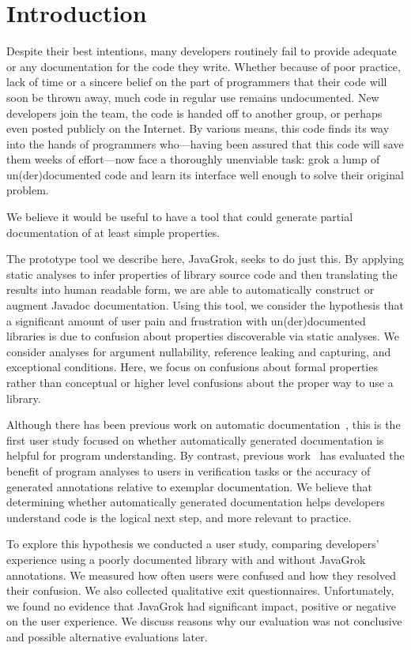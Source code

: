 \section{Introduction}

Despite their best intentions, many developers routinely fail to provide
adequate or any documentation for the code they write.  Whether because of poor
practice, lack of time or a sincere belief on the part of programmers that their
code will soon be thrown away, much code in regular use remains undocumented.
New developers join the team, the code is handed off to another group, or
perhaps even posted publicly on the Internet.  By various means, this code
finds its way into the hands of programmers who---having been assured that this
code will save them weeks of effort---now face a thoroughly unenviable task:
grok a lump of un(der)documented code and learn its interface well enough
to solve their original problem.

We believe it would be useful to have a tool that could generate partial
documentation of at least simple properties.

The prototype tool we describe here, JavaGrok, seeks to do just this.  By
applying static analyses to infer properties of library source code and then
translating the results into human readable form, we are able to
automatically construct or augment Javadoc documentation.
Using this tool, we
consider the hypothesis that a significant amount of user pain and frustration
with un(der)documented libraries is due to confusion about
properties discoverable via static analyses. We consider analyses for argument nullability,
reference leaking and capturing, and exceptional conditions.
Here, we focus on confusions about formal properties
rather than conceptual
or higher level confusions about the proper way to use a library.

Although there has been previous work on automatic
documentation~\cite{autodoc}, this is the first user study
focused on whether automatically generated documentation is helpful for program
understanding.  By contrast, previous work~\cite{autodoc, Nimmer2002} has
evaluated the benefit of program analyses to users in verification tasks or the
accuracy of generated annotations relative to exemplar documentation.
We believe that determining whether automatically generated documentation helps
developers understand code is the logical next step, and more relevant to practice.

To explore this hypothesis we conducted a user study, comparing developers'
experience using a poorly documented library with and without JavaGrok
annotations.  We measured how often users were confused and how they resolved their confusion.  We also collected qualitative exit
questionnaires.  Unfortunately, we found no evidence that JavaGrok had
significant impact, positive or negative on the user experience.  We discuss
reasons why our evaluation was not conclusive and possible alternative
evaluations later.

